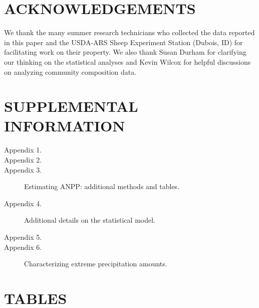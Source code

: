 \documentclass[fleqn,10pt,lineno]{wlpeerj} %
\begin{document}
\section{ACKNOWLEDGEMENTS}\label{acknowledgements}

We thank the many summer research technicians who collected the data
reported in this paper and the USDA-ARS Sheep Experiment Station
(Dubois, ID) for facilitating work on their property. We also thank
Susan Durham for clarifying our thinking on the statistical analyses and
Kevin Wilcox for helpful discussions on analyzing community composition
data.

\section{SUPPLEMENTAL INFORMATION}\label{supplemental-information}

\begin{description}
\item [Appendix 1.] 
\item [Appendix 2.] 
\item [Appendix 3.] Estimating ANPP: additional methods and tables.
\item [Appendix 4.] Additional details on the statistical model.
\item [Appendix 5.] 
\item [Appendix 6.] Characterizing extreme precipitation amounts.
\end{description}

\newpage{}

\section{TABLES}\label{tables}
\end{document}
